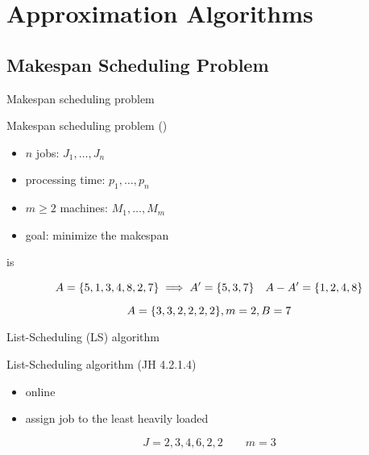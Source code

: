 \section{Approximation Algorithms}

\subsection{Makespan Scheduling Problem}

\begin{frame}{Makespan scheduling problem}
  \begin{exampleblock}{Makespan scheduling problem (\ms{})}
	\begin{itemize}
	  \item $n$ jobs: $J_1, \dots, J_n$
	  \item processing time: $p_1, \dots, p_n$
	  \item $m \ge 2$ machines: $M_1, \dots, M_m$
	 ­\item goal: minimize the makespan
	\end{itemize}
  \end{exampleblock}
\end{frame}
\begin{frame}{\ms{} is \npc{}}
  \begin{definition}[Partition]
  \end{definition}

  \[
	A = \{5,1,3,4,8,2,7\} \implies A' = \{5,3,7\} \quad A - A' = \{1,2,4,8\}
  \]

  \begin{definition}[$3$-Partition]
  \end{definition}

  \[
	A = \{3,3,2,2,2,2\}, m = 2, B = 7
  \]
\end{frame}
\begin{frame}{List-Scheduling (LS) algorithm}
  \begin{exampleblock}{List-Scheduling algorithm (JH 4.2.1.4)}
	\begin{itemize}
	  \item online
	  \item assign job to the least heavily loaded
	\end{itemize}
  \end{exampleblock}

  \[
	J = {2,3,4,6,2,2} \qquad m = 3
  \]
\end{frame}

